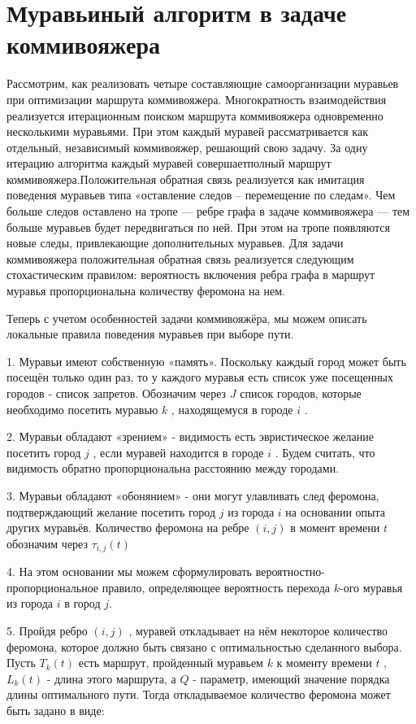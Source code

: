 \documentclass[12pt]{report}
\begin{document}
\section{Муравьиный алгоритм в задаче коммивояжера}
Рассмотрим, как реализовать четыре составляющие самоорганизации муравьев при оптимизации маршрута коммивояжера. Многократность взаимодействия реализуется итерационным поиском маршрута коммивояжера одновременно несколькими муравьями. При этом каждый муравей рассматривается как отдельный, независимый коммивояжер, решающий свою задачу. За одну итерацию алгоритма каждый муравей совершаетполный маршрут коммивояжера.Положительная обратная связь реализуется как имитация поведения муравьев типа «оставление следов – перемещение по следам». Чем больше следов оставлено на тропе — ребре графа в задаче коммивояжера  — тем больше муравьев будет передвигаться по ней. При этом на тропе появляются новые следы, привлекающие дополнительных муравьев. Для задачи коммивояжера положительная обратная связь реализуется следующим стохастическим правилом: вероятность включения ребра графа в маршрут муравья пропорциональна количеству феромона на нем.
		
Теперь с учетом особенностей задачи коммивояжёра, мы можем описать локальные правила поведения муравьев при выборе пути.\
		
	1. Муравьи имеют собственную «память». Поскольку каждый город может быть посещён только один раз, то у каждого муравья есть список уже посещенных городов - список запретов. Обозначим через $J$ список городов, которые необходимо посетить муравью $k$ , находящемуся в городе $i$ . 
	
	2. Муравьи обладают «зрением» - видимость есть эвристическое желание посетить город $j$ , если муравей находится в городе $i$ . Будем считать, что видимость обратно пропорциональна расстоянию между городами. 
	
	3. Муравьи обладают «обонянием» - они могут улавливать след феромона, подтверждающий желание посетить город $j$ из города $i$ на основании опыта других муравьёв. Количество феромона на ребре $(i,j)$ в момент времени $t$ обозначим через  $\tau _{i,j} (t)$ 
	
	 4. На этом основании мы можем сформулировать вероятностно-пропорциональное правило, определяющее вероятность перехода $k$-ого муравья из города $i$  в город $j$. 
	 
	5. Пройдя ребро $(i,j)$ , муравей откладывает на нём некоторое количество феромона, которое должно быть связано с оптимальностью сделанного выбора. Пусть $T _{k} (t)$ есть маршрут, пройденный муравьем $k$ к моменту времени $t$ , $L _{k} (t)$ - длина этого маршрута, а $Q$ - параметр, имеющий значение порядка длины оптимального пути. Тогда откладываемое количество феромона может быть задано в виде:
	
\end{document}
